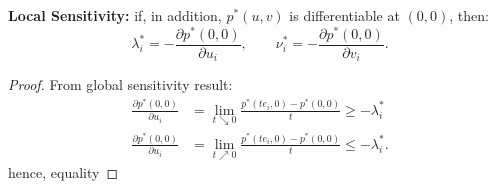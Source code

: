 \documentclass{report}
\theoremstyle{remark} \newtheorem{remark}{Remark}[section]
\theoremstyle{definition}
\theoremstyle{definition}
\theoremstyle{definition}
\theoremstyle{remark}
\begin{document}
\textbf{Local Sensitivity:} if, in addition, $p^{*}(u,v)$ is differentiable at  $(0,0)$, then:
\[
\lambda_i^{*} = -\frac{\partial p^{*}(0,0)}{\partial u_i}, \qquad \nu_i^{*} = -\frac{\partial p^{*}(0,0)}{\partial v_i} 
.\] 

\begin{proof}
    From global sensitivity result:
    \begin{align*}
        \frac{\partial p^{*}(0,0)}{\partial u_i} &= \lim_{t \searrow 0}\frac{p^{*}(te_i,0)-p^{*}(0,0)}{t}  \ge -\lambda_i^{*} \\
        \frac{\partial p^{*}(0,0)}{\partial u_i} &= \lim_{t \nearrow 0} \frac{p^{*}(te_i,0)-p^{*}(0,0)}{t} \le -\lambda_i^{*} 
    .\end{align*}
    hence, equality
\end{proof}
 
\end{document}
